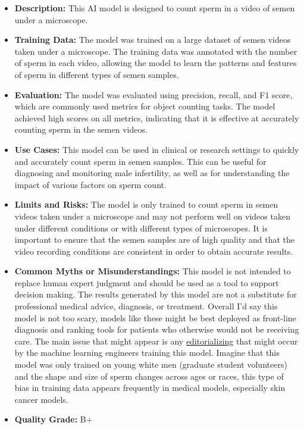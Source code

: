 \begin{itemize}
    \item \textbf{Description:} This AI model is designed to count sperm in a video of semen under a microscope.
    \item \textbf{Training Data:} The model was trained on a large dataset of semen videos taken under a microscope. The training data was annotated with the number of sperm in each video, allowing the model to learn the patterns and features of sperm in different types of semen samples.
    \item \textbf{Evaluation:} The model was evaluated using precision, recall, and F1 score, which are commonly used metrics for object counting tasks. The model achieved high scores on all metrics, indicating that it is effective at accurately counting sperm in the semen videos.
    \item \textbf{Use Cases:} This model can be used in clinical or research settings to quickly and accurately count sperm in semen samples. This can be useful for diagnosing and monitoring male infertility, as well as for understanding the impact of various factors on sperm count.
    \item \textbf{Limits and Risks:} The model is only trained to count sperm in semen videos taken under a microscope and may not perform well on videos taken under different conditions or with different types of microscopes. It is important to ensure that the semen samples are of high quality and that the video recording conditions are consistent in order to obtain accurate results.
    \item \textbf{Common Myths or Misunderstandings:} This model is not intended to replace human expert judgment and should be used as a tool to support decision making. The results generated by this model are not a substitute for professional medical advice, diagnosis, or treatment. Overall I'd say this model is not too scary, models like these might be best deployed as front-line diagnosis and ranking tools for patients who otherwise would not be receiving care. The main issue that might appear is any \hyperref[sec:janitor]{editorializing} that might occur by the machine learning engineers training this model. Imagine that this model was only trained on young white men (graduate student volunteers) and the shape and size of sperm changes across ages or races, this type of bias in training data appears frequently in medical models, especially skin cancer models.
    \item \textbf{Quality Grade:} B+

\end{itemize}
